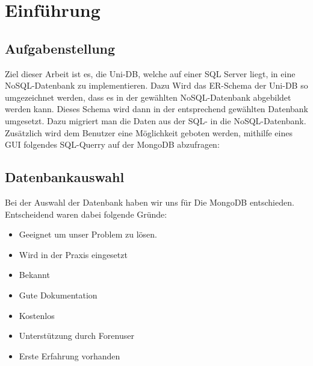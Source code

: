 \section{Einführung}

\subsection{Aufgabenstellung}
Ziel dieser Arbeit ist es, die Uni-DB, welche auf einer SQL Server liegt, in eine NoSQL-Datenbank zu implementieren. Dazu Wird das ER-Schema der Uni-DB so umgezeichnet werden, dass es in der gewählten NoSQL-Datenbank abgebildet werden kann. Dieses Schema wird dann in der entsprechend gewählten Datenbank umgesetzt. Dazu migriert man die Daten aus der SQL- in die NoSQL-Datenbank.
Zusätzlich wird dem Benutzer eine Möglichkeit geboten werden, mithilfe eines GUI folgendes SQL-Querry auf der MongoDB abzufragen:




\newpage
\subsection{Datenbankauswahl}
Bei der Auswahl der Datenbank haben wir uns für Die MongoDB entschieden. Entscheidend waren dabei folgende Gründe:
\begin{itemize}
  \item Geeignet um unser Problem zu lösen.
  \item Wird in der Praxis eingesetzt
  \item Bekannt
  \item Gute Dokumentation
  \item Kostenlos
  \item Unterstützung durch Forenuser
  \item Erste Erfahrung vorhanden
\end{itemize}

